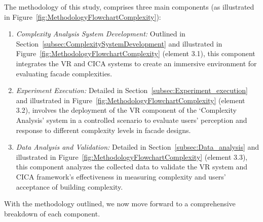 The methodology of this study, comprises three main components (as illustrated in  Figure~\ref{fig:MethodologyFlowchartComplexity}):
\begin{enumerate}
    \item \textit{Complexity Analysis System Development:}  Outlined in Section~\ref{subsec:ComplexitySystemDevelopment} and illustrated in Figure~\ref{fig:MethodologyFlowchartComplexity} (element 3.1), this component integrates the VR and CICA systems to create an immersive environment for evaluating facade complexities.
    \item \textit{Experiment Execution:} Detailed in Section~\ref{subsec:Experiment_execution} and illustrated in Figure~\ref{fig:MethodologyFlowchartComplexity} (element 3.2), involves the deployment of the VR component of the `Complexity Analysis' system in a controlled scenario to evaluate users' perception and response to different complexity levels in facade designs.
    \item \textit{Data Analysis and Validation:} Detailed in Section~\ref{subsec:Data_analysis} and illustrated in Figure~\ref{fig:MethodologyFlowchartComplexity} (element 3.3), this component analyzes the collected data to validate the VR system and CICA framework's effectiveness in measuring complexity and users' acceptance of building complexity.
\end{enumerate}

With the methodology outlined, we now move forward to a comprehensive breakdown of each component.


